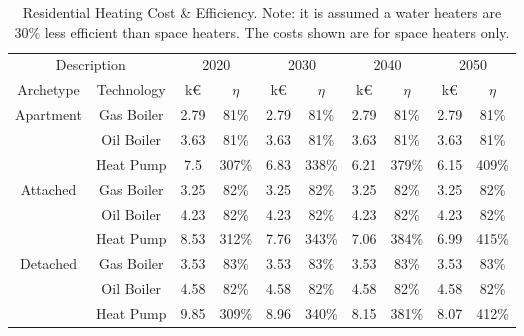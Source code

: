 \documentclass[journal abbreviation, manuscript]{copernicus}
\begin{document}
\begin{table}[!htbp]
 \centering
 \footnotesize
 \caption{Residential Heating Cost \& Efficiency. Note: it is assumed a water heaters are 30\% less efficient than space heaters. The costs shown are for space heaters only.}
 \begin{tabular}{cccccccccc}
 \hline
 \multicolumn{2}{c}{Description} & \multicolumn{2}{c}{2020} & \multicolumn{2}{c}{2030} & \multicolumn{2}{c}{2040} & \multicolumn{2}{c}{2050} \\
 
 Archetype & Technology & k€ & $\eta$ & k€ & $\eta$ & k€ & $\eta$ & k€ & $\eta$ \\
 \hline
 \multirow{3}{*}{Apartment}&Gas Boiler & 2.79 & 81\% & 2.79 & 81\% & 2.79 & 81\% & 2.79 & 81\% \\
 & Oil Boiler & 3.63 & 81\% & 3.63 & 81\% & 3.63 & 81\% & 3.63 & 81\% \\
 & Heat Pump & 7.5 & 307\% & 6.83 & 338\% & 6.21 & 379\% & 6.15 & 409\% \\
 \hline
 \multirow{3}{*}{Attached}&Gas Boiler & 3.25 & 82\% & 3.25 & 82\% & 3.25 & 82\% & 3.25 & 82\% \\
 & Oil Boiler & 4.23 & 82\% & 4.23 & 82\% & 4.23 & 82\% & 4.23 & 82\% \\
 & Heat Pump & 8.53 & 312\% & 7.76 & 343\% & 7.06 & 384\% & 6.99 & 415\% \\
 \hline
 \multirow{3}{*}{Detached}&Gas Boiler & 3.53 & 83\% & 3.53 & 83\% & 3.53 & 83\% & 3.53 & 83\% \\
 & Oil Boiler & 4.58 & 82\% & 4.58 & 82\% & 4.58 & 82\% & 4.58 & 82\% \\
 & Heat Pump & 9.85 & 309\% & 8.96 & 340\% & 8.15 & 381\% & 8.07 & 412\% \\ \hline
 \end{tabular}
 
 \label{Residential Heating Cost & Efficiency}
\end{table}
\end{document}
